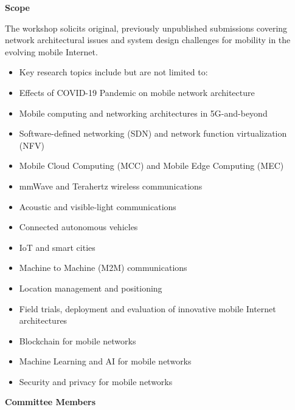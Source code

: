 \documentclass{easychair}
\begin{document}
\textbf{Scope}



The workshop solicits original, previously unpublished submissions covering network architectural issues and system design challenges for mobility in the evolving mobile Internet.




\begin{itemize}
	
\item Key research topics include but are not limited to:
	
\item Effects of COVID-19 Pandemic on mobile network architecture
	
\item Mobile computing and networking architectures in 5G-and-beyond
	
\item Software-defined networking (SDN) and network function virtualization (NFV)
	
\item Mobile Cloud Computing (MCC) and Mobile Edge Computing (MEC)
	
\item mmWave and Terahertz wireless communications
	
\item Acoustic and visible-light communications
	
\item Connected autonomous vehicles
	
\item IoT and smart cities
	
\item Machine to Machine (M2M) communications
	
\item Location management and positioning
	
\item Field trials, deployment and evaluation of innovative mobile Internet architectures
	
\item Blockchain for mobile networks
	
\item Machine Learning and AI for mobile networks
	
\item Security and privacy for mobile networks
\end{itemize}


\textbf{Committee Members}
\end{document}
